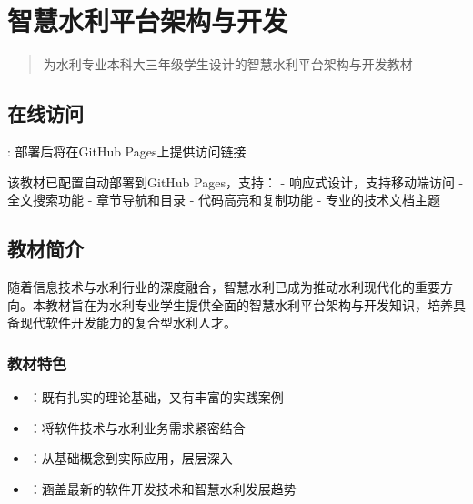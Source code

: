 \hypertarget{ux667aux6167ux6c34ux5229ux5e73ux53f0ux67b6ux6784ux4e0eux5f00ux53d1}{%
\section{智慧水利平台架构与开发}\label{ux667aux6167ux6c34ux5229ux5e73ux53f0ux67b6ux6784ux4e0eux5f00ux53d1}}

\begin{quote}
为水利专业本科大三年级学生设计的智慧水利平台架构与开发教材
\end{quote}

\hypertarget{ux5728ux7ebfux8bbfux95ee}{%
\subsection{在线访问}\label{ux5728ux7ebfux8bbfux95ee}}

: 部署后将在GitHub Pages上提供访问链接

该教材已配置自动部署到GitHub Pages，支持： - 响应式设计，支持移动端访问 - \faSearch 全文搜索功能 - 章节导航和目录 - \faLightbulb 代码高亮和复制功能 - 专业的技术文档主题

\hypertarget{ux6559ux6750ux7b80ux4ecb}{%
\subsection{教材简介}\label{ux6559ux6750ux7b80ux4ecb}}

随着信息技术与水利行业的深度融合，智慧水利已成为推动水利现代化的重要方向。本教材旨在为水利专业学生提供全面的智慧水利平台架构与开发知识，培养具备现代软件开发能力的复合型水利人才。

\hypertarget{ux6559ux6750ux7279ux8272}{%
\subsubsection{教材特色}\label{ux6559ux6750ux7279ux8272}}

\begin{itemize}
\tightlist
\item
  ：既有扎实的理论基础，又有丰富的实践案例
\item
  ：将软件技术与水利业务需求紧密结合
\item
  ：从基础概念到实际应用，层层深入
\item
  ：涵盖最新的软件开发技术和智慧水利发展趋势
\end{itemize}

